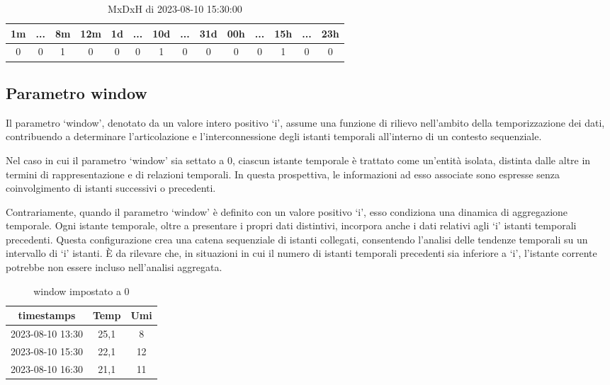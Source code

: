 \documentclass[a4paper,10pt]{article}
\begin{document}
\begin{table}[h]\centering
  \begin{tabular}{|*{14}{c|}}
  
  \hline
  1m & ... & 8m & 12m & 1d & ... & 10d & ... & 31d & 00h & ... & 15h & ... & 23h\\
  \hline
  0 & 0 & 1 & 0 & 0 & 0 & 1 & 0 & 0 & 0 & 0 & 1 & 0 & 0\\
  \hline
  
  \end{tabular}
  
  \caption{MxDxH di 2023-08-10 15:30:00}
\end{table}

\subsection{Parametro window}

Il parametro `window', denotato da un valore intero positivo `i', assume una funzione di rilievo nell'ambito della temporizzazione dei dati, 
contribuendo a determinare l'articolazione e l'interconnessione degli istanti temporali all'interno di un contesto sequenziale.

Nel caso in cui il parametro `window' sia settato a 0, ciascun istante temporale è trattato come un'entità isolata, distinta dalle altre in termini 
di rappresentazione e di relazioni temporali. In questa prospettiva, le informazioni ad esso associate sono espresse senza coinvolgimento di 
istanti successivi o precedenti.

Contrariamente, quando il parametro `window' è definito con un valore positivo `i', esso condiziona una dinamica di aggregazione temporale. 
Ogni istante temporale, oltre a presentare i propri dati distintivi, incorpora anche i dati relativi agli `i' istanti temporali precedenti. 
Questa configurazione crea una catena sequenziale di istanti collegati, consentendo l'analisi delle tendenze temporali su un intervallo di `i' istanti. 
È da rilevare che, in situazioni in cui il numero di istanti temporali precedenti sia inferiore a `i', 
l'istante corrente potrebbe non essere incluso nell'analisi aggregata.



\begin{table}[h]
  \begin{tabular}{|*{3}{c|}}
  
  \hline
  timestamps & Temp & Umi\\
  \hline
  2023-08-10 13:30 & 25,1 & 8\\
  \hline
  2023-08-10 15:30 & 22,1 & 12\\
  \hline
  2023-08-10 16:30 & 21,1 & 11\\
  \hline
  
  \end{tabular}
  
  \caption{window impostato a 0}
\end{table}
\end{document}
